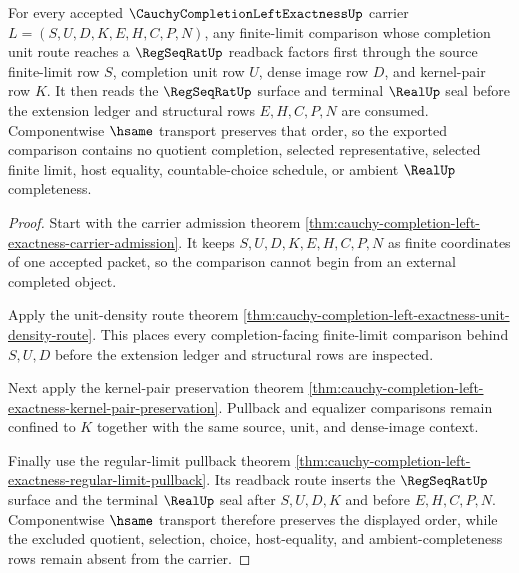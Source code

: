 \begin{theorem}
\label{thm:cauchy-completion-left-exactness-regseqrat-unit-pullback}
For every accepted $\CauchyCompletionLeftExactnessUp$ carrier $L=(S,U,D,K,E,H,C,P,N)$, any finite-limit comparison whose completion unit route reaches a $\RegSeqRatUp$ readback factors first through the source finite-limit row $S$, completion unit row $U$, dense image row $D$, and kernel-pair row $K$. It then reads the $\RegSeqRatUp$ surface and terminal $\RealUp$ seal before the extension ledger and structural rows $E,H,C,P,N$ are consumed. Componentwise $\hsame$ transport preserves that order, so the exported comparison contains no quotient completion, selected representative, selected finite limit, host equality, countable-choice schedule, or ambient $\RealUp$ completeness.
\end{theorem}
\begin{proof}
Start with the carrier admission theorem \autoref{thm:cauchy-completion-left-exactness-carrier-admission}. It keeps $S,U,D,K,E,H,C,P,N$ as finite coordinates of one accepted packet, so the comparison cannot begin from an external completed object.

Apply the unit-density route theorem \autoref{thm:cauchy-completion-left-exactness-unit-density-route}. This places every completion-facing finite-limit comparison behind $S,U,D$ before the extension ledger and structural rows are inspected.

Next apply the kernel-pair preservation theorem \autoref{thm:cauchy-completion-left-exactness-kernel-pair-preservation}. Pullback and equalizer comparisons remain confined to $K$ together with the same source, unit, and dense-image context.

Finally use the regular-limit pullback theorem \autoref{thm:cauchy-completion-left-exactness-regular-limit-pullback}. Its readback route inserts the $\RegSeqRatUp$ surface and the terminal $\RealUp$ seal after $S,U,D,K$ and before $E,H,C,P,N$. Componentwise $\hsame$ transport therefore preserves the displayed order, while the excluded quotient, selection, choice, host-equality, and ambient-completeness rows remain absent from the carrier.
\end{proof}


